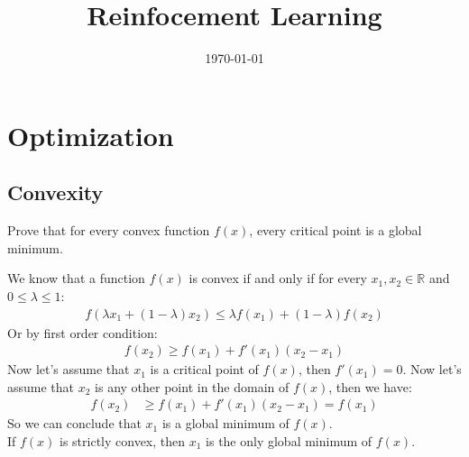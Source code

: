 \documentclass[12pt]{article}
\title{Reinfocement Learning}
\date{\today}
\begin{document}
\maketitlepage
\maketitlestart



\section{Optimization}
\subsection{Convexity}
Prove that for every convex function $f(x)$, every critical point is a global minimum.\\
\begin{qsolve}[solution]
    We know that a function $f(x)$ is convex if and only if for every $x_1, x_2 \in \mathbb{R}$ and $0 \leq \lambda \leq 1$:
    \begin{align*}
        f(\lambda x_1 + (1-\lambda)x_2) \leq \lambda f(x_1) + (1-\lambda)f(x_2)
    \end{align*}
    Or by first order condition:
    \begin{align*}
        f(x_2) \geq f(x_1) + f'(x_1)(x_2-x_1)
    \end{align*}
    Now let's assume that $x_1$ is a critical point of $f(x)$, then $f'(x_1) = 0$. Now let's assume that $x_2$ is any other point in the domain of $f(x)$, then we have:
    \begin{align*}
        f(x_2) & \geq f(x_1) + f'(x_1)(x_2-x_1) = f(x_1)
    \end{align*}
    So we can conclude that $x_1$ is a global minimum of $f(x)$.\\
    If $f(x)$ is strictly convex, then $x_1$ is the only global minimum of $f(x)$.
\end{qsolve}
\end{document}
